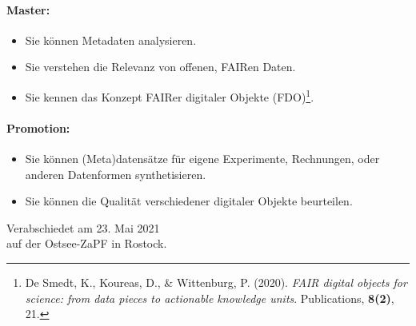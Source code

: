 \documentclass[DIV=calc]{scrartcl}
\begin{document}
\paragraph{Master:}
\begin{itemize}
	\item Sie können Metadaten analysieren.
	\item Sie verstehen die Relevanz von offenen, FAIRen Daten.
	\item Sie kennen das Konzept FAIRer digitaler Objekte (FDO)\footnote{De Smedt, K., Koureas, D., \& Wittenburg, P. (2020). \textit{FAIR digital objects for science: from data pieces
		to actionable knowledge units}. Publications, \textbf{8(2)}, 21.}.
\end{itemize}

\paragraph{Promotion:}
\begin{itemize}
	\item Sie können (Meta)datensätze für eigene Experimente, Rechnungen, oder anderen Datenformen synthetisieren.
	\item Sie können die Qualität verschiedener digitaler Objekte beurteilen.
\end{itemize}


\vfill
\begin{flushright}
	Verabschiedet am 23. Mai 2021 \\
	auf der Ostsee-ZaPF in Rostock.
\end{flushright}




\end{document}
